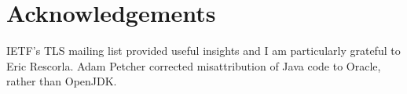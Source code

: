 \section*{Acknowledgements}

IETF's TLS mailing list provided useful insights and I am particularly grateful 
to Eric Rescorla. Adam Petcher corrected misattribution of Java code to Oracle, 
rather than OpenJDK.
